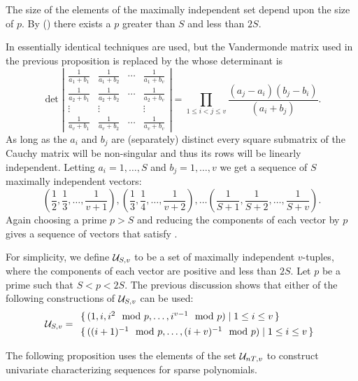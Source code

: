 The size of the elements of the maximally independent set depend upon
the size of $p$.  By 
() there exists a $p$ greater than
$S$ and less than $2S$.  

In \cite{Grigorev1990-bj} essentially identical techniques are used, but
the Vandermonde matrix used in the previous proposition is replaced by
the  whose determinant is
\begin{equation}\label{Zero:Cauchy:Eq}
\det\left|
  \begin{array}{cccc}
\frac{1}{a_1+b_1} & \frac{1}{a_1+b_2} & \cdots & \frac{1}{a_1+b_v} \\[3pt]
\frac{1}{a_2+b_1} & \frac{1}{a_2+b_2} & \cdots & \frac{1}{a_2+b_v} \\[3pt]
\vdots & \vdots & & \vdots \\[3pt]
\frac{1}{a_v+b_1} & \frac{1}{a_v+b_2} & \cdots & \frac{1}{a_v+b_v} 
\end{array}\right|
=
\prod_{1\le i < j \le v}\frac{(a_j - a_i) (b_j - b_i)}{(a_i + b_j)}.
\end{equation}
As long as the $a_i$ and $b_j$ are (separately) distinct every square
submatrix of the Cauchy matrix will be non-singular and thus its rows will
be linearly independent.  Letting $a_i = 1, \ldots, S$ and $b_j = 1,
\ldots, v$ we get a sequence  of $S$ maximally independent vectors:
\[
(\frac{1}{2}, \frac{1}{3}, \ldots, \frac{1}{v+1}), 
(\frac{1}{3}, \frac{1}{4}, \ldots, \frac{1}{v+2}), \ldots
(\frac{1}{S+1}, \frac{1}{S+2}, \ldots, \frac{1}{S+v}).
\]
Again choosing a prime $p > S$ and reducing the components of each
vector by $p$ gives a sequence of vectors that satisfy
.  

For simplicity, we define ${\cal U}_{S,v}$ to be a set of maximally
independent $v$-tuples, where the components of each vector are
positive and less than $2S$.  Let $p$ be a prime such that $S < p
<2S$.  The previous discussion shows that either of the following
constructions of ${\cal U}_{S,v}$ can be used:
\[
{\cal U}_{S,v} =
\begin{array}{l}
  \{\, (1, i, i^2\mod p, \ldots, i^{v-1} \mod p) \mid 1 \le i \le v \,
\} \\[4pt]
  \{\, ((i+1)^{-1} \mod p, \ldots, (i+v)^{-1} \mod p) 
      \mid 1 \le i \le v \,\}
\end{array}
\]

\medskip
The following proposition uses the elements of the set ${\cal
U}_{nT,v}$ to construct univariate characterizing sequences for sparse 
polynomials.

